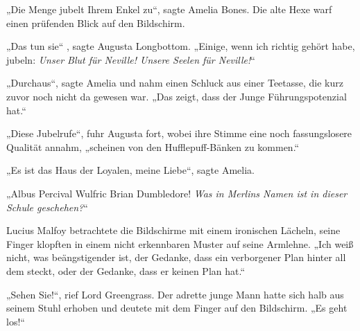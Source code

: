 „Die Menge jubelt Ihrem Enkel zu“, sagte Amelia Bones. Die alte Hexe warf einen prüfenden Blick auf den Bildschirm.

„Das tun sie“ , sagte Augusta Longbottom. „Einige, wenn ich richtig gehört habe, jubeln: \emph{Unser Blut für Neville! Unsere Seelen für Neville!}“

„Durchaus“, sagte Amelia und nahm einen Schluck aus einer Teetasse, die kurz zuvor noch nicht da gewesen war. „Das zeigt, dass der Junge Führungspotenzial hat.“

„Diese Jubelrufe“, fuhr Augusta fort, wobei ihre Stimme eine noch fassungslosere Qualität annahm, „scheinen von den Hufflepuff-Bänken zu kommen.“

„Es ist das Haus der Loyalen, meine Liebe“, sagte Amelia.

„Albus Percival Wulfric Brian Dumbledore! \emph{Was in Merlins Namen ist in dieser Schule geschehen?}“

Lucius Malfoy betrachtete die Bildschirme mit einem ironischen Lächeln, seine Finger klopften in einem nicht erkennbaren Muster auf seine Armlehne. „Ich weiß nicht, was beängstigender ist, der Gedanke, dass ein verborgener Plan hinter all dem steckt, oder der Gedanke, dass er keinen Plan hat.“

„Sehen Sie!“, rief Lord Greengrass. Der adrette junge Mann hatte sich halb aus seinem Stuhl erhoben und deutete mit dem Finger auf den Bildschirm. „Es geht los!“

